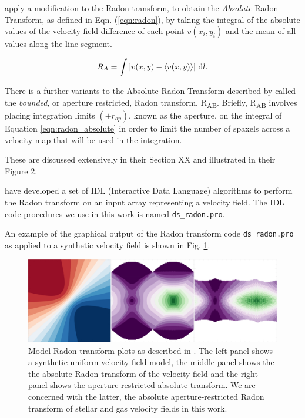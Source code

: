 \citet{2018MNRAS.480.2217S} apply a modification to the Radon transform, to obtain the \textit{Absolute} Radon Transform, as defined in Eqn. (\ref{eqn:radon}), by taking the integral of the absolute values of the velocity field difference of each point $v(x_i,y_i)$ and the mean of all values along the line segment.

\begin{equation}
    \label{eqn:radon_absolute}
    R_A=\int{| v(x,y) - \langle v(x,y) \rangle | \, \mathop{}\!\mathrm{d}l}.
\end{equation}

There is a further variants to the Absolute Radon Transform described by \citet{2018MNRAS.480.2217S} called the \textit{bounded}, or aperture restricted, Radon transform, R\textsubscript{AB}. Briefly, R\textsubscript{AB} involves placing integration limits $(\pm{r_{ap}})$, known as the aperture, on the integral of Equation \ref{eqn:radon_absolute} in order to limit the number of spaxels across a velocity map that will be used in the integration.

These are discussed extensively in their Section XX and illustrated in their Figure 2.


\citet{2018MNRAS.480.2217S} have developed a set of IDL (Interactive Data Language) algorithms to perform the Radon transform on an input array representing a velocity field. The IDL code procedures we use in this work is named \texttt{ds\_radon.pro}.

An example of the graphical output of the Radon transform code \texttt{ds\_radon.pro} as applied to a synthetic velocity field is shown in Fig. \ref{fig:Radon}.

\begin{figure}
    \centering
   	\includegraphics[width=\columnwidth]{images/RadonPlots/example.png}
    \caption{Model Radon transform plots as described in \citet{2018MNRAS.480.2217S}. The left panel shows a synthetic uniform velocity field model, the middle panel shows the the absolute Radon transform of the velocity field and the right panel shows the aperture-restricted absolute transform. We are concerned with the latter, the absolute aperture-restricted  Radon transform of stellar and gas velocity fields in this work.}
    \label{fig:Radon}
\end{figure}


